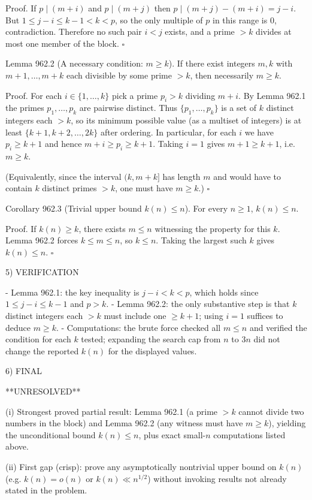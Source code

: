 Proof.
If $p\mid (m+i)$ and $p\mid (m+j)$ then $p\mid (m+j)-(m+i)=j-i$. But $1\le j-i\le k-1<k<p$, so the only multiple of $p$ in this range is $0$, contradiction. Therefore no such pair $i<j$ exists, and a prime $>k$ divides at most one member of the block. $\square$

Lemma 962.2 (A necessary condition: $m\ge k$).
If there exist integers $m,k$ with $m+1,\dots,m+k$ each divisible by some prime $>k$, then necessarily $m\ge k$.

Proof.
For each $i\in\{1,\dots,k\}$ pick a prime $p_i>k$ dividing $m+i$. By Lemma 962.1 the primes $p_1,\dots,p_k$ are pairwise distinct. Thus $\{p_1,\dots,p_k\}$ is a set of $k$ distinct integers each $>k$, so its minimum possible value (as a multiset of integers) is at least $\{k+1,k+2,\dots,2k\}$ after ordering. In particular, for each $i$ we have $p_i\ge k+1$ and hence $m+i\ge p_i\ge k+1$. Taking $i=1$ gives $m+1\ge k+1$, i.e. $m\ge k$.

(Equivalently, since the interval $(k,m+k]$ has length $m$ and would have to contain $k$ distinct primes $>k$, one must have $m\ge k$.) $\square$

Corollary 962.3 (Trivial upper bound $k(n)\le n$).
For every $n\ge 1$, $k(n)\le n$.

Proof.
If $k(n)\ge k$, there exists $m\le n$ witnessing the property for this $k$. Lemma 962.2 forces $k\le m\le n$, so $k\le n$. Taking the largest such $k$ gives $k(n)\le n$. $\square$

5) VERIFICATION

- Lemma 962.1: the key inequality is $j-i<k<p$, which holds since $1\le j-i\le k-1$ and $p>k$.
- Lemma 962.2: the only substantive step is that $k$ distinct integers each $>k$ must include one $\ge k+1$; using $i=1$ suffices to deduce $m\ge k$.
- Computations: the brute force checked all $m\le n$ and verified the condition for each $k$ tested; expanding the search cap from $n$ to $3n$ did not change the reported $k(n)$ for the displayed values.

6) FINAL

**UNRESOLVED**

(i) Strongest proved partial result: Lemma 962.1 (a prime $>k$ cannot divide two numbers in the block) and Lemma 962.2 (any witness must have $m\ge k$), yielding the unconditional bound $k(n)\le n$, plus exact small-$n$ computations listed above.

(ii) First gap (crisp): prove any asymptotically nontrivial upper bound on $k(n)$ (e.g. $k(n)=o(n)$ or $k(n)\ll n^{1/2}$) without invoking results not already stated in the problem.


